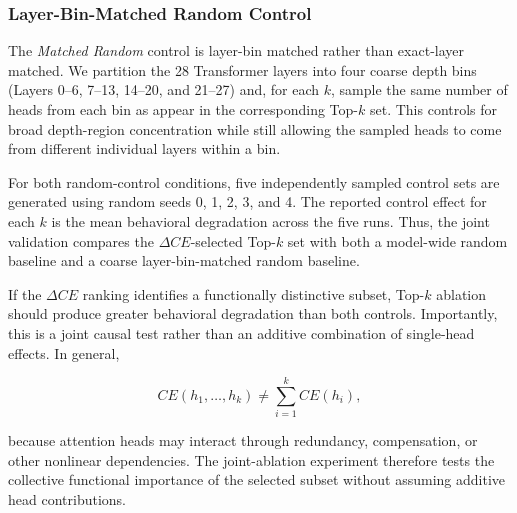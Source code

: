 \subsubsection{Layer-Bin-Matched Random Control}

The \emph{Matched Random} control is layer-bin matched rather than exact-layer matched. We partition the 28 Transformer layers into four coarse depth bins (Layers 0--6, 7--13, 14--20, and 21--27) and, for each $k$, sample the same number of heads from each bin as appear in the corresponding Top-$k$ set. This controls for broad depth-region concentration while still allowing the sampled heads to come from different individual layers within a bin.

For both random-control conditions, five independently sampled control sets are generated using random seeds 0, 1, 2, 3, and 4. The reported control effect for each $k$ is the mean behavioral degradation across the five runs. Thus, the joint validation compares the $\Delta CE$-selected Top-$k$ set with both a model-wide random baseline and a coarse layer-bin-matched random baseline.

If the $\Delta CE$ ranking identifies a functionally distinctive subset, Top-$k$ ablation should produce greater behavioral degradation than both controls. Importantly, this is a joint causal test rather than an additive combination of single-head effects. In general,

\begin{equation}
CE(h_1,\ldots,h_k)
\neq
\sum_{i=1}^{k} CE(h_i),
\label{eq:nonadditive_heads}
\end{equation}

because attention heads may interact through redundancy, compensation, or other nonlinear dependencies. The joint-ablation experiment therefore tests the collective functional importance of the selected subset without assuming additive head contributions.

\FloatBarrier
